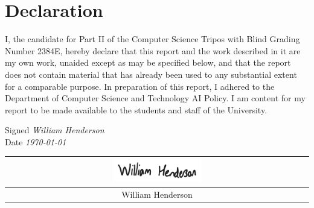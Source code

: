 \chapter*{Declaration}

I, the candidate for Part II of the Computer Science Tripos with Blind Grading Number 2384E, hereby declare that this report and the work described in it are my own work, unaided except as may be specified below, and that the report does not contain material that has already been used to any substantial extent for a comparable purpose. In preparation of this report, I adhered to the Department of Computer Science and Technology AI Policy. I am content for my report to be made available to the students and staff of the University.

Signed {\it William Henderson} \\
Date {\it \today}

\hfill {
  \begin{tabular}{c}
    \includegraphics[width=0.3\textwidth]{signature.png} \\
    \hline \rule{0pt}{1.2em} William Henderson
  \end{tabular}
}